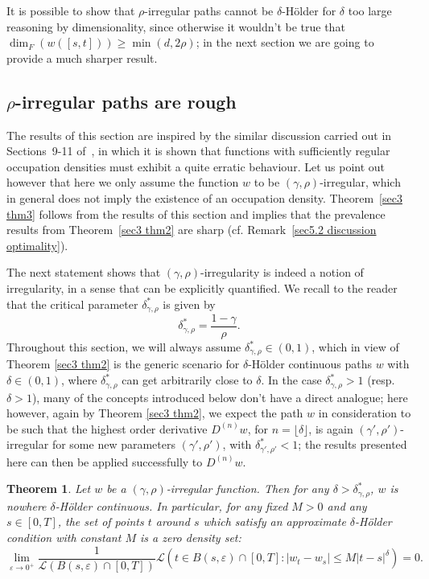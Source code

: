 \documentclass[10pt]{article}
\newtheorem{theorem}{Theorem}%
\begin{document}
It is possible to show that $\rho$\mbox{-}irregular paths cannot be
$\delta$\mbox{-}H\"{o}lder for $\delta$ too large reasoning by dimensionality,
since otherwise it wouldn't be true that $\dim_F (w ([s, t])) \geqslant \min
(d, 2 \rho)$; in the next section we are going to provide a much sharper
result.

\subsection{$\rho$\mbox{-}irregular paths are rough}\label{sec5.2}

The results of this section are inspired by the similar discussion carried out
in Sections~9\mbox{-}11 of~{\cite{geman}}, in which it is shown that functions
with sufficiently regular occupation densities must exhibit a quite erratic
behaviour. Let us point out however that here we only assume the function $w$
to be $(\gamma, \rho)$\mbox{-}irregular, which in general does not imply the
existence of an occupation density. Theorem~\ref{sec3 thm3} follows from the
results of this section and implies that the prevalence results from
Theorem~\ref{sec3 thm2} are sharp (cf. Remark~\ref{sec5.2 discussion
optimality}).

The next statement shows that $(\gamma, \rho)$\mbox{-}irregularity is indeed a
notion of irregularity, in a sense that can be explicitly quantified. We
recall to the reader that the critical parameter $\delta^{\ast}_{\gamma,
\rho}$ is given by
\[ \delta^{\ast}_{\gamma, \rho} = \frac{1 - \gamma}{\rho} . \]
%
Throughout this section, we will always assume $\delta^\ast_{\gamma,\rho}\in (0,1)$, which in view of Theorem \ref{sec3 thm2} is the generic scenario for $\delta$-H\"older continuous paths $w$ with $\delta\in (0,1)$, where $\delta^\ast_{\gamma,\rho}$ can get arbitrarily close to $\delta$.
In the case $\delta^\ast_{\gamma,\rho}>1$ (resp. $\delta>1$), many of the concepts introduced below don't have a direct analogue; here however, again by Theorem \ref{sec3 thm2}, we expect the path $w$ in consideration to be such that the highest order derivative $D^{(n)}w$, for $n=\lfloor \delta \rfloor$, is again $(\gamma',\rho')$-irregular for some new parameters $(\gamma',\rho')$, with $\delta^{\ast}_{\gamma',\rho'}<1$; the results presented here can then be applied successfully to $D^{(n)}w$.


\begin{theorem}
  \label{sec5.2 proposition irregularity}Let $w$ be a $(\gamma,
  \rho)$-irregular function. Then for any $\delta > \delta^{\ast}_{\gamma,
  \rho}$, $w$ is nowhere $\delta$\mbox{-}H\"{o}lder continuous. In particular,
  for any fixed $M > 0$ and any $s \in [0, T]$, the set of points $t$ around
  $s$ which satisfy an approximate $\delta$\mbox{-}H\"{o}lder condition with
  constant $M$ is a zero density set:
  \[ \lim_{\varepsilon \rightarrow 0^+} \frac{1}{\mathcal{L} (B (s,
     \varepsilon) \cap [0, T])} \mathcal{L} (t \in B (s, \varepsilon) \cap [0,
     T] : | w_t - w_s | \leqslant M | t - s |^{\delta}) = 0. \]
\end{theorem}
\end{document}
